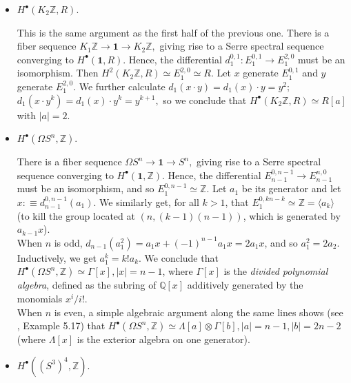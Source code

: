 \documentclass{amsart}
\theoremstyle{definition}
\newcommand{\ZZ}{\mathbb{Z}}
\newcommand{\CC}{\mathbb{C}}
\newcommand{\QQ}{\mathbb{Q}}
\newcommand{\im}{\operatorname{im}}
\newcommand{\sgtn}{\mathbf{1}}
\begin{document}
\begin{itemize}
    For the same conclusion for a general ring $R$, note that finite-dimensional CW-complexes have finite cohomological dimension as their cohomology groups can be calculated from the cellular chain complex, as in \cite{BuchFav}. Taking Example 8 from \cite{MimOle} with $K_2 \ZZ$ in place of $B\ZZ_2$, we conclude that $\CC P^n$ is such a CW-complex. From the spectral sequence it follows that $H^{2n+2k}(\CC P^n, R) = \im d_1^{2n,1}$ for all $k>0$, and hence $d_1^{2n,1} = 0$.
\item
    $H^\bullet(K_2\mathbb{Z}, R)$.

    This is the same argument as the first half of the previous one. There is a fiber sequence $K_1\mathbb{Z} \to \sgtn \to K_2\mathbb{Z},$ giving rise to a Serre spectral sequence converging to $H^\bullet(\sgtn, R)$. Hence, the differential $d_1^{0,1}: E_{1}^{0, 1} \to E_{1}^{2,0}$ must be an isomorphism. Then $H^2(K_2\mathbb{Z}, R) \simeq E_{1}^{2,0} \simeq  R.$ Let $x$ generate $E_{1}^{0, 1}$ and $y$ generate $E_{1}^{2,0}$. We further calculate $d_1(x \cdot y) = d_1(x) \cdot y = y^2;$ $d_1(x \cdot y^k) = d_1(x) \cdot y^k = y^{k+1},$ so we conclude that $H^\bullet(K_2\mathbb{Z}, R) \simeq R[a]$ with $|a|=2.$
\item
    $H^\bullet(\Omega S^n, \mathbb{Z})$.

    There is a fiber sequence $\Omega S^n \to \sgtn \to S^n,$ giving rise to a Serre spectral sequence converging to $H^\bullet(\sgtn, \ZZ)$. Hence, the differential $E_{n-1}^{0, n-1} \to E_{n-1}^{n,0}$ must be an isomorphism, and so $E_1^{0, n-1} \simeq \ZZ$. Let $a_1$ be its generator and let $x : \equiv d_{n-1}^{0, n-1}(a_1)$. We similarly get, for all $k > 1$, that $E_1^{0, kn-k} \simeq \ZZ = \langle a_k \rangle$ (to kill the group located at $(n, (k-1)(n-1))$, which is generated by $a_{k-1} x$).
    \\
    When $n$ is odd, $d_{n-1}(a_1^2) = a_1x + (-1)^{n-1} a_1x = 2 a_1 x$, and so $a_1^2 =  2a_2$. Inductively, we get $a_1^k = k! a_{k}$. We conclude that $H^\bullet(\Omega S^n, \mathbb{Z}) \simeq \Gamma[x], |x| = n-1$, where $\Gamma[x]$ is the \textit{divided polynomial algebra}, defined as the subring of $\QQ[x]$ additively generated by the monomials $x^i/i!$.
    \\
    When $n$ is even, a simple algebraic argument along the same lines shows (see \cite{Hat5}, Example 5.17) that $H^\bullet(\Omega S^n, \mathbb{Z}) \simeq \Lambda [a] \otimes \Gamma[b], |a| = n-1, |b| = 2n - 2$ (where $\Lambda[x]$ is the exterior algebra on one generator).
\item
    $H^\bullet(({S^3})^4, \ZZ)$.


\end{itemize}
\end{document}
